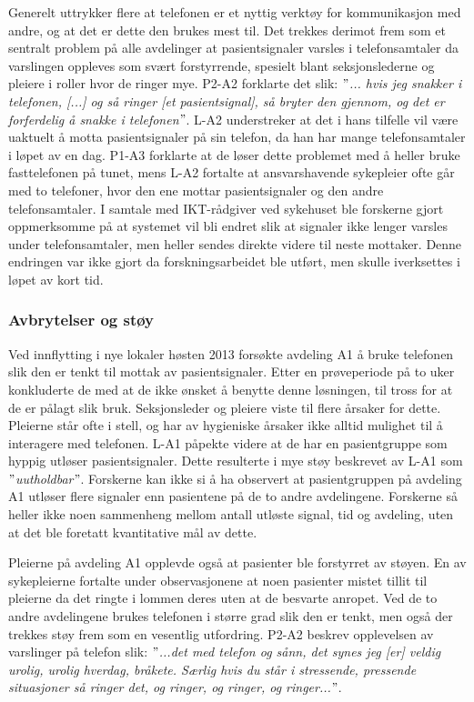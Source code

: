 \noindent
Generelt uttrykker flere at telefonen er et nyttig verktøy for kommunikasjon med andre, og at det er dette den brukes mest til. Det trekkes derimot frem som et sentralt problem på alle avdelinger at pasientsignaler varsles i telefonsamtaler da varslingen oppleves som svært forstyrrende, spesielt blant seksjonslederne og pleiere i roller hvor de ringer mye. P2-A2 forklarte det slik: \textit{ $"$... hvis jeg snakker i telefonen, [...] og så ringer [et pasientsignal], så bryter den gjennom, og det er forferdelig å snakke i telefonen$"$}. L-A2 understreker at det i hans tilfelle vil være uaktuelt å motta pasientsignaler på sin telefon, da han har mange telefonsamtaler i løpet av en dag. P1-A3 forklarte at de løser dette problemet med å heller bruke fasttelefonen på tunet, mens L-A2 fortalte at ansvarshavende sykepleier ofte går med to telefoner, hvor den ene mottar pasientsignaler og den andre telefonsamtaler. I samtale med IKT-rådgiver ved sykehuset ble forskerne gjort oppmerksomme på at systemet vil bli endret slik at signaler ikke lenger varsles under telefonsamtaler, men heller sendes direkte videre til neste mottaker. Denne endringen var ikke gjort da forskningsarbeidet ble utført, men skulle iverksettes i løpet av kort tid.

\subsubsection{Avbrytelser og støy}
Ved innflytting i nye lokaler høsten 2013 forsøkte avdeling A1 å bruke telefonen slik den er tenkt til mottak av pasientsignaler. Etter en prøveperiode på to uker konkluderte de med at de ikke ønsket å benytte denne løsningen, til tross for at de er pålagt slik bruk. Seksjonsleder og pleiere viste til flere årsaker for dette. Pleierne står ofte i stell, og har av hygieniske årsaker ikke alltid mulighet til å interagere med telefonen. L-A1 påpekte videre at de har en pasientgruppe som hyppig utløser pasientsignaler. Dette resulterte i mye støy beskrevet av L-A1 som \textit{$"$uutholdbar$"$}. Forskerne kan ikke si å ha observert at pasientgruppen på avdeling A1 utløser flere signaler enn pasientene på de to andre avdelingene. Forskerne så heller ikke noen sammenheng mellom antall utløste signal, tid og avdeling, uten at det ble foretatt kvantitative mål av dette.

\noindent
Pleierne på avdeling A1 opplevde også at pasienter ble forstyrret av støyen. En av sykepleierne fortalte under observasjonene at noen pasienter mistet tillit til pleierne da det ringte i lommen deres uten at de besvarte anropet. Ved de to andre avdelingene brukes telefonen i større grad slik den er tenkt, men også der trekkes støy frem som en vesentlig utfordring. P2-A2 beskrev opplevelsen av varslinger på telefon slik: \textit{ $"$...det med telefon og sånn, det synes jeg [er] veldig urolig, urolig hverdag, bråkete. Særlig hvis du står i stressende, pressende situasjoner så ringer det, og ringer, og ringer, og ringer...$"$}. 


